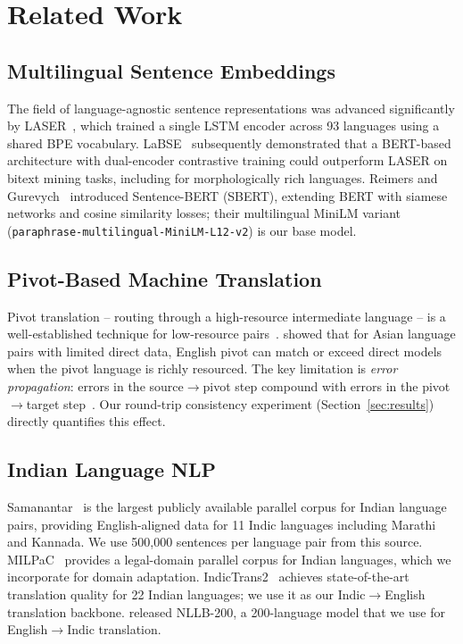 \documentclass[11pt,a4paper]{article}
\begin{document}
\section{Related Work}
\label{sec:related}

\subsection{Multilingual Sentence Embeddings}
The field of language-agnostic sentence representations was advanced
significantly by LASER~\cite{artetxe2019massively}, which trained
a single LSTM encoder across 93 languages using a shared BPE
vocabulary. LaBSE~\cite{feng2022labse} subsequently demonstrated
that a BERT-based architecture with dual-encoder contrastive training
could outperform LASER on bitext mining tasks, including for
morphologically rich languages.
Reimers and Gurevych~\cite{reimers2019sentencebert} introduced
Sentence-BERT (SBERT), extending BERT with siamese networks and
cosine similarity losses; their multilingual MiniLM variant
(\texttt{paraphrase-multilingual-MiniLM-L12-v2}) is our base model.

\subsection{Pivot-Based Machine Translation}
Pivot translation -- routing through a high-resource intermediate
language -- is a well-established technique for low-resource
pairs~\cite{utiyama2007pivot,wu2007pivot}.
\citet{paul2009pivotmt} showed that for Asian language pairs with
limited direct data, English pivot can match or exceed direct
models when the pivot language is richly resourced.
The key limitation is \emph{error propagation}: errors in the
source$\rightarrow$pivot step compound with errors in the
pivot$\rightarrow$target step~\cite{babych2007pivotmt}.
Our round-trip consistency experiment (Section~\ref{sec:results})
directly quantifies this effect.

\subsection{Indian Language NLP}
Samanantar~\cite{ramesh2021samanantar} is the largest publicly
available parallel corpus for Indian language pairs, providing
English-aligned data for 11 Indic languages including Marathi and
Kannada. We use 500,000 sentences per language pair from this source.
MILPaC~\cite{milpac2022} provides a legal-domain parallel corpus for
Indian languages, which we incorporate for domain adaptation.
IndicTrans2~\cite{gala2023indictrans2} achieves state-of-the-art
translation quality for 22 Indian languages; we use it as our
Indic$\rightarrow$English translation backbone.
\citet{nllb2022} released NLLB-200, a 200-language model that we
use for English$\rightarrow$Indic translation.
\end{document}
